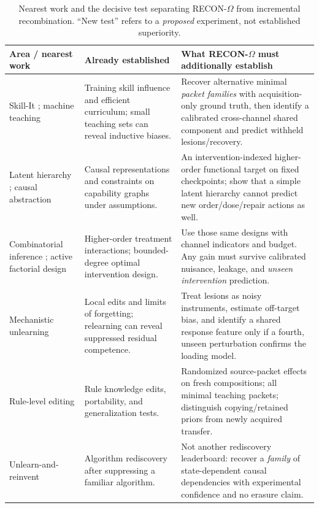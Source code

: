 \documentclass[11pt,a4paper]{article}
\theoremstyle{definition}\newtheorem{definition}[theorem]{Definition}
\theoremstyle{remark}\newtheorem{remark}[theorem]{Remark}
\begin{document}
\begin{table}[htbp]\centering\footnotesize
\caption{Nearest work and the decisive test separating RECON-$\Omega$ from incremental recombination. ``New test'' refers to a \emph{proposed} experiment, not established superiority.}\label{tab:prior}
\begin{tabularx}{\linewidth}{@{}p{.21\linewidth}Y Y@{}}\toprule
\textbf{Area / nearest work}&\textbf{Already established}&\textbf{What RECON-$\Omega$ must additionally establish}\\\midrule
Skill-It \citep{skillit}; machine teaching \citep{jaimovitch,teaching}&Training skill influence and efficient curriculum; small teaching sets can reveal inductive biases.&Recover alternative minimal \emph{packet families} with acquisition-only ground truth, then identify a calibrated cross-channel shared component and predict withheld lesions/recovery.\\
Latent hierarchy \citep{jin2026}; causal abstraction \citep{geiger}&Causal representations and constraints on capability graphs under assumptions.&An intervention-indexed higher-order functional target on fixed checkpoints; show that a simple latent hierarchy cannot predict new order/dose/repair actions as well.\\
Combinatorial inference \citep{syntheticcomb}; active factorial design \citep{shyamal}&Higher-order treatment interactions; bounded-degree optimal intervention design.&Use those same designs with channel indicators and budget. Any gain must survive calibrated nuisance, leakage, and \emph{unseen intervention} prediction.\\
Mechanistic unlearning \citep{guo,hu2025,fan2025}&Local edits and limits of forgetting; relearning can reveal suppressed residual competence.&Treat lesions as noisy instruments, estimate off-target bias, and identify a shared response feature only if a fourth, unseen perturbation confirms the loading model.\\
Rule-level editing \citep{ruleedit,editingrules}&Rule knowledge edits, portability, and generalization tests.&Randomized source-packet effects on fresh compositions; all minimal teaching packets; distinguish copying/retained priors from newly acquired transfer.\\
Unlearn-and-reinvent \citep{reinvent,unlearningablation}&Algorithm rediscovery after suppressing a familiar algorithm.&Not another rediscovery leaderboard: recover a \emph{family} of state-dependent causal dependencies with experimental confidence and no erasure claim.\\

\end{tabularx}
\end{table}
\end{document}
